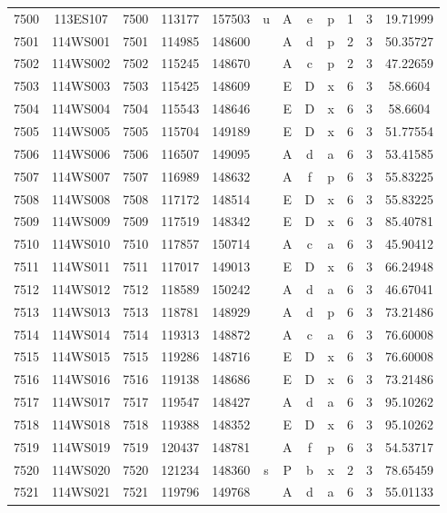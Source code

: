 \begin{tabular}{|*{12}{c|}}
7500 & 113ES107 & 7500 & 113177 & 157503 & u & A & e & p & 1 & 3 & 19.71999 \\ 
7501 & 114WS001 & 7501 & 114985 & 148600 &  & A & d & p & 2 & 3 & 50.35727 \\ 
7502 & 114WS002 & 7502 & 115245 & 148670 &  & A & c & p & 2 & 3 & 47.22659 \\ 
7503 & 114WS003 & 7503 & 115425 & 148609 &  & E & D & x & 6 & 3 & 58.6604 \\ 
7504 & 114WS004 & 7504 & 115543 & 148646 &  & E & D & x & 6 & 3 & 58.6604 \\ 
7505 & 114WS005 & 7505 & 115704 & 149189 &  & E & D & x & 6 & 3 & 51.77554 \\ 
7506 & 114WS006 & 7506 & 116507 & 149095 &  & A & d & a & 6 & 3 & 53.41585 \\ 
7507 & 114WS007 & 7507 & 116989 & 148632 &  & A & f & p & 6 & 3 & 55.83225 \\ 
7508 & 114WS008 & 7508 & 117172 & 148514 &  & E & D & x & 6 & 3 & 55.83225 \\ 
7509 & 114WS009 & 7509 & 117519 & 148342 &  & E & D & x & 6 & 3 & 85.40781 \\ 
7510 & 114WS010 & 7510 & 117857 & 150714 &  & A & c & a & 6 & 3 & 45.90412 \\ 
7511 & 114WS011 & 7511 & 117017 & 149013 &  & E & D & x & 6 & 3 & 66.24948 \\ 
7512 & 114WS012 & 7512 & 118589 & 150242 &  & A & d & a & 6 & 3 & 46.67041 \\ 
7513 & 114WS013 & 7513 & 118781 & 148929 &  & A & d & p & 6 & 3 & 73.21486 \\ 
7514 & 114WS014 & 7514 & 119313 & 148872 &  & A & c & a & 6 & 3 & 76.60008 \\ 
7515 & 114WS015 & 7515 & 119286 & 148716 &  & E & D & x & 6 & 3 & 76.60008 \\ 
7516 & 114WS016 & 7516 & 119138 & 148686 &  & E & D & x & 6 & 3 & 73.21486 \\ 
7517 & 114WS017 & 7517 & 119547 & 148427 &  & A & d & a & 6 & 3 & 95.10262 \\ 
7518 & 114WS018 & 7518 & 119388 & 148352 &  & E & D & x & 6 & 3 & 95.10262 \\ 
7519 & 114WS019 & 7519 & 120437 & 148781 &  & A & f & p & 6 & 3 & 54.53717 \\ 
7520 & 114WS020 & 7520 & 121234 & 148360 & s & P & b & x & 2 & 3 & 78.65459 \\ 
7521 & 114WS021 & 7521 & 119796 & 149768 &  & A & d & a & 6 & 3 & 55.01133 \\ 

\end{tabular}
